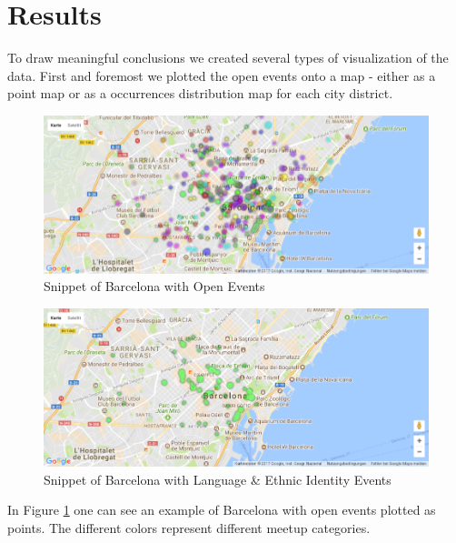 \section{Results}\label{sec:results}

To draw meaningful conclusions we created several types of visualization of the data. First and foremost we plotted the open events onto a map - either as a point map or as a occurrences distribution map for each city district. 

\begin{figure}[!htp]
	\includegraphics[width=1\linewidth]{images/Barcelona_points.png}
	\caption{Snippet of Barcelona with Open Events}\label{fig:barcelonapoints}	
\end{figure}

\begin{figure}[!htp]
	\includegraphics[width=1\linewidth]{images/Barcelona_points_Language.png}
	\caption{Snippet of Barcelona with Language \& Ethnic Identity Events}\label{fig:barcelonapointslanguage}	
\end{figure}

In Figure \ref{fig:barcelonapoints} one can see an example of Barcelona with open events plotted as points. The different colors represent different meetup categories. 

